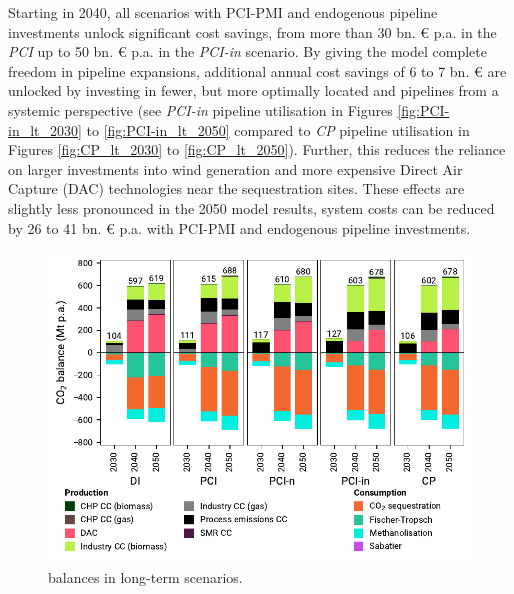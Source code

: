 \documentclass[preprint,12pt,sort&compress]{elsarticle}
\begin{document}
Starting in 2040, all scenarios with PCI-PMI and endogenous pipeline investments unlock significant cost savings, from more than 30 bn. \euro{} p.a. in the \textit{PCI} up to 50 bn. \euro{} p.a. in the \textit{PCI-in} scenario. By giving the model complete freedom in pipeline expansions, additional annual cost savings of 6 to 7 bn. \euro{} are unlocked by investing in fewer, but more optimally located  and  pipelines from a systemic perspective (see \textit{PCI-in} pipeline utilisation in Figures \ref{fig:PCI-in_lt_2030} to \ref{fig:PCI-in_lt_2050} compared to \textit{CP} pipeline utilisation in Figures \ref{fig:CP_lt_2030} to \ref{fig:CP_lt_2050}). Further, this reduces the reliance on larger investments into wind generation and more expensive Direct Air Capture (DAC) technologies near the sequestration sites. These effects are slightly less pronounced in the 2050 model results, system costs can be reduced by 26 to 41 bn. \euro{} p.a. with PCI-PMI and endogenous pipeline investments. 

\begin{figure}[htbp]
  \centering
  \includegraphics[width=\textwidth]{balances_overview_co2 stored}
  \caption{ balances in long-term scenarios.}
  \label{fig:balances_overview_co2_stored}
\end{figure}
\end{document}
